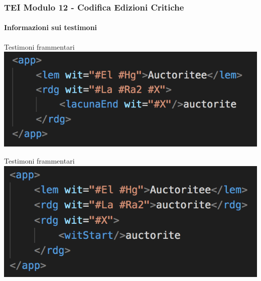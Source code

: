 \begin{frame}
    \frametitle{TEI Modulo 12 - Codifica Edizioni Critiche}
    \framesubtitle{Informazioni sui testimoni}
    \addtocounter{nframe}{1}
    






    \begin{block}{Testimoni frammentari}
       \includegraphics[width=.95\textwidth]{imgs/rdg-lacunaEnd.png}
    \end{block}

    \begin{block}{Testimoni frammentari}
        \includegraphics[width=.95\textwidth]{imgs/rdg-witStart.png}
     \end{block}


\end{frame}


